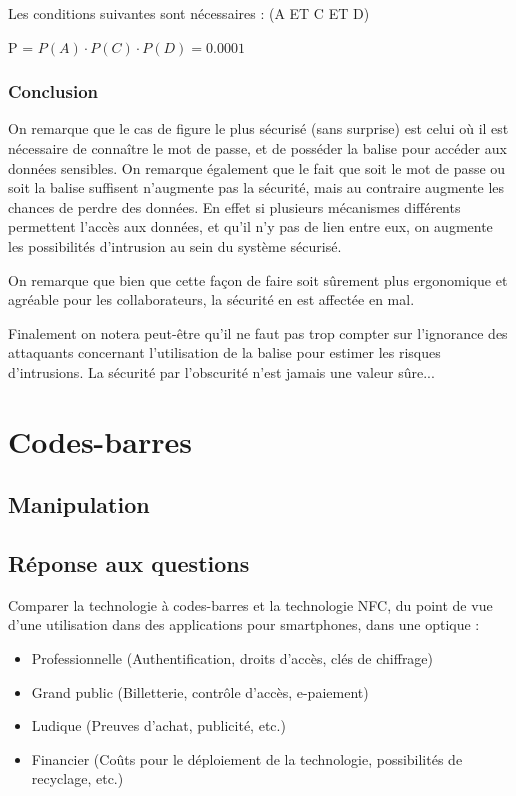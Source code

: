 \documentclass[francais,12pt]{article}
\begin{document}
	 Les conditions suivantes sont nécessaires : (A ET C ET D)
	 
	 P = $ P(A) \cdot P(C) \cdot P(D) = 0.0001 $
	 
	 \subsubsection*{Conclusion}
	 On remarque que le cas de figure le plus sécurisé (sans surprise) est celui où il est nécessaire de connaître le mot de passe, et de posséder la balise pour accéder aux données sensibles. On remarque également que le fait que soit le mot de passe ou soit la balise suffisent n'augmente pas la sécurité, mais au contraire augmente les chances de perdre des données. En effet si plusieurs mécanismes différents permettent l'accès aux données, et qu'il n'y pas de lien entre eux, on augmente les possibilités d'intrusion au sein du système sécurisé. 
	 
	 On remarque que bien que cette façon de faire soit sûrement plus ergonomique et agréable pour les collaborateurs, la sécurité en est affectée en mal.
	 
	 Finalement on notera peut-être qu'il ne faut pas trop compter sur l'ignorance des attaquants concernant l'utilisation de la balise pour estimer les risques d'intrusions. La sécurité par l'obscurité n'est jamais une valeur sûre...
	 
	\section*{Codes-barres}
	\subsection*{Manipulation}
	\subsection*{Réponse aux questions}
	Comparer la technologie à codes-barres et la technologie NFC, du point de vue d'une utilisation dans des applications pour smartphones, dans une optique : 
	\begin{itemize}
		\item Professionnelle (Authentification, droits d’accès, clés de chiffrage)
		\item Grand public (Billetterie, contrôle d’accès, e-paiement) 
		\item Ludique (Preuves d'achat, publicité, etc.)
		\item Financier (Coûts pour le déploiement de la technologie, possibilités de recyclage, etc.) 
	\end{itemize}
\end{document}
